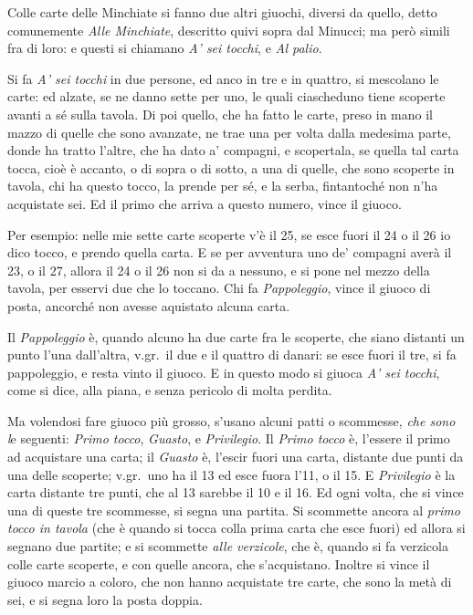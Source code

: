 \documentclass[11pt,a5paper]{article}
\begin{document}
Colle carte delle Minchiate si fanno
due altri giuochi, diversi da quello,
detto comunemente \textit{Alle Minchiate},
descritto quivi sopra dal Minucci; ma
però simili fra di loro: e questi si chiamano
\textit{A' sei tocchi}, e \textit{Al palio}.

Si fa \textit{A' sei tocchi} in due persone, ed anco in tre e in quattro, si
mescolano le carte: ed alzate, se ne danno sette per uno, le quali
ciascheduno tiene scoperte avanti a sé sulla tavola.  Di poi quello,
che ha fatto le carte, preso in mano il mazzo di quelle che sono
avanzate, ne trae una per volta dalla medesima parte, donde ha tratto
l'altre, che ha dato a' compagni, e scopertala, se quella tal carta
tocca, cioè è accanto, o di sopra o di sotto, a una di quelle, che sono
scoperte in tavola, chi ha questo tocco, la prende per sé, e la serba,
fintantoché non n'ha acquistate sei. Ed il primo che arriva a questo
numero, vince il giuoco.

Per esempio: nelle mie sette carte scoperte v'è il 25, se esce fuori il
24 o il 26 io dico tocco, e prendo quella carta.  E se per avventura
uno de' compagni averà il 23, o il 27, allora il 24 o il 26 non si da a
nessuno, e si pone nel mezzo della tavola, per esservi due che lo
toccano.  Chi fa \textit{Pappoleggio}, vince il giuoco di posta, ancorché non
avesse aquistato alcuna carta.

Il \textit{Pappoleggio} è, quando alcuno ha due carte fra le scoperte, che siano
distanti un punto l'una dall'altra, v.gr.\ il due e il quattro di
danari: se esce fuori il tre, si fa pappoleggio, e resta vinto il
giuoco.  E in questo modo si giuoca \textit{A' sei tocchi}, come si dice, alla
piana, e senza pericolo di molta perdita.

Ma volendosi fare giuoco più grosso, s'usano alcuni patti o scommesse,
\textit{ che sono l}e seguenti: \textit{Primo tocco}, \textit{Guasto}, e
\textit{Privilegio}. Il \textit{Primo tocco} è, l'essere il primo ad
acquistare una carta; il \textit{Guasto} è, l'escir fuori una carta,
distante due punti da una delle scoperte; v.gr.\ uno ha il 13 ed esce fuora
l'11, o il 15.  E \textit{Privilegio} è la carta distante tre punti, che al
13 sarebbe il 10 e il 16.  Ed ogni volta, che si vince una di queste tre
scommesse, si segna una partita.  Si scommette ancora al \textit{primo tocco
  in tavola} (che è quando si tocca colla prima carta che esce fuori) ed
allora si segnano due partite; e si scommette \textit{alle verzicole}, che
è, quando si fa verzicola colle carte scoperte, e con quelle ancora, che
s'acquistano.  Inoltre si vince il giuoco marcio a coloro, che non hanno
acquistate tre carte, che sono la metà di sei, e si segna loro la posta
doppia.
\end{document}
